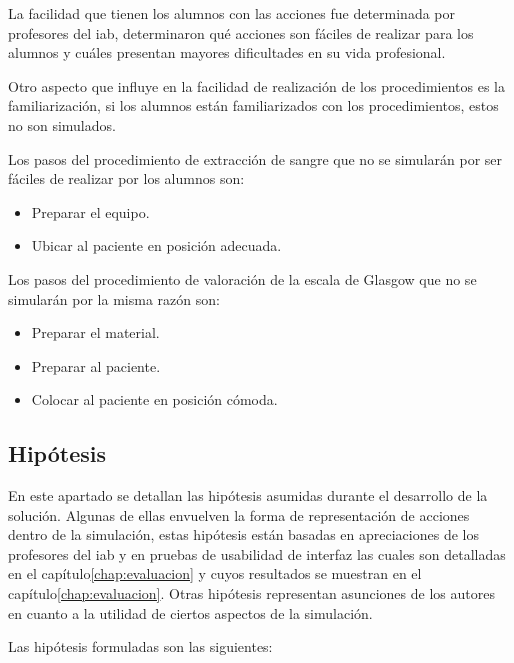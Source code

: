 \begin{itemize}
    La facilidad que tienen los alumnos con las acciones fue determinada por
    profesores del \Gls{iab}, determinaron qué acciones son fáciles de realizar
    para los alumnos y cuáles presentan mayores dificultades en su vida
    profesional.

    Otro aspecto que influye en la facilidad de realización de los
    procedimientos es la familiarización, si los alumnos están familiarizados
    con los procedimientos, estos no son simulados.
        
    Los pasos del procedimiento de extracción de sangre que no se simularán por
    ser fáciles de realizar por los alumnos son:
        
    \begin{itemize}
        \item Preparar el equipo.
        \item Ubicar al paciente en posición adecuada.
    \end{itemize}
    
    Los pasos del procedimiento de valoración de la escala de Glasgow 
    que no se simularán por la misma razón son:
    \begin{itemize}
    \item Preparar el material.
    \item Preparar al paciente.
    \item Colocar al paciente en posición cómoda.
    \end{itemize}
        
\end{itemize}

\subsection{Hipótesis}
\label{sec:hipotesis}

En este apartado se detallan las hipótesis asumidas durante el desarrollo de 
la solución. Algunas de ellas envuelven la forma de representación de acciones 
dentro de la simulación, estas hipótesis están  basadas en apreciaciones de los 
profesores del \Gls{iab} y en pruebas de usabilidad de interfaz las cuales son 
detalladas en el capítulo\ref{chap:evaluacion} y cuyos resultados se muestran en
el capítulo\ref{chap:evaluacion}. Otras hipótesis representan asunciones de los autores 
en cuanto a la utilidad de ciertos aspectos de la simulación.

Las hipótesis formuladas son las siguientes:

